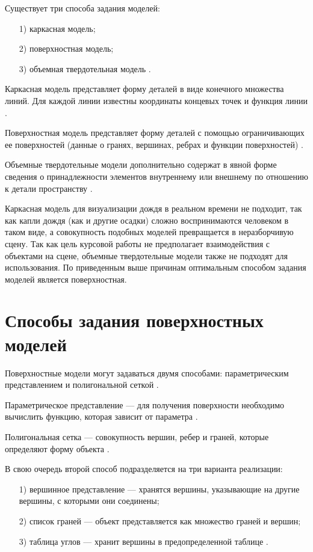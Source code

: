 Существует три способа задания моделей:

\begin{enumerate}
\item[1)]
каркасная модель;
\item[2)]
поверхностная модель;
\item[3)]
объемная твердотельная модель \cite{Kuritsina2011}.
\end{enumerate}

Каркасная модель представляет форму деталей в виде конечного множества линий. Для каждой линии известны координаты концевых точек и функция линии \cite{Kuritsina2011}.

Поверхностная модель представляет форму деталей с помощью ограничивающих ее поверхностей (данные о гранях, вершинах, ребрах и функции поверхностей) \cite{Kuritsina2011}.

Объемные твердотельные модели дополнительно содержат в явной форме сведения о принадлежности элементов внутреннему или внешнему по отношению к детали пространству \cite{Kuritsina2011}.

Каркасная модель для визуализации дождя в реальном времени не подходит, так как капли дождя (как и другие осадки) сложно воспринимаются человеком в таком виде, а совокупность подобных моделей превращается в неразборчивую сцену. 
Так как цель курсовой работы не предполагает взаимодействия с объектами на сцене, объемные твердотельные модели также не подходят для использования. 
По приведенным выше причинам оптимальным способом задания моделей является поверхностная.

\section{Способы задания поверхностных моделей}

Поверхностные модели могут задаваться двумя способами: параметрическим представлением и полигональной сеткой \cite{Kuritsina2011}.

Параметрическое представление --- для получения поверхности необходимо вычислить функцию, которая зависит от параметра \cite{Kuritsina2011}.

Полигональная сетка --- совокупность вершин, ребер и граней, которые определяют форму объекта \cite{Kuritsina2011}.

В свою очередь второй способ подразделяется на три варианта реализации:

\begin{enumerate}
\item[1)]
вершинное представление --- хранятся вершины, указывающие на другие вершины, с которыми они соединены;
\item[2)]
список граней --- объект представляется как множество граней и вершин;
\item[3)]
таблица углов --- хранит вершины в предопределенной таблице \cite{Kuritsina2011}.
\end{enumerate}

